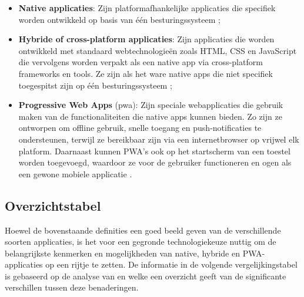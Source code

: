 \begin{itemize}
    \item \textbf{Native applicaties}: Zijn platformafhankelijke applicaties die specifiek worden ontwikkeld op basis van één besturingssysteem \autocite{Gerges2024};
    \item \textbf{Hybride of cross-platform applicaties}: Zijn applicaties die worden ontwikkeld met standaard webtechnologieën zoals HTML, CSS en JavaScript die vervolgens worden verpakt als een native app via cross-platform frameworks en tools. Ze zijn als het ware native apps die niet specifiek toegespitst zijn op één besturingssysteem \autocite{Gerges2024};
    \item \textbf{Progressive Web Apps} (\acrshort{pwa}): Zijn speciale webapplicaties die gebruik maken van de functionaliteiten die native apps kunnen bieden. Zo zijn ze ontworpen om offline gebruik, snelle toegang en push-notificaties te ondersteunen, terwijl ze bereikbaar zijn via een internetbrowser op vrijwel elk platform. Daarnaast kunnen PWA’s ook op het startscherm van een toestel worden toegevoegd, waardoor ze voor de gebruiker functioneren en ogen als een gewone mobiele applicatie \autocite{Gerges2024}.
\end{itemize}

\vspace{1em}

\subsection{Overzichtstabel}
\label{subsec:app-tech-overzicht}

\vspace{1em}

Hoewel de bovenstaande definities een goed beeld geven van de verschillende soorten applicaties, is het voor een gegronde technologiekeuze nuttig om de belangrijkste kenmerken en mogelijkheden van native, hybride en PWA-applicaties op een rijtje te zetten. De informatie in de volgende vergelijkingstabel is gebaseerd op de analyse van \textcite{Gerges2024} en \textcite{Samsyudin2025} welke een overzicht geeft van de significante verschillen tussen deze benaderingen.

\vspace{1em}
\vspace{1em}

